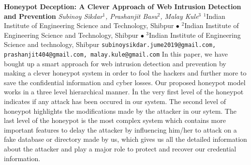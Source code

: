 
    \begin{conf-abstract}[]
        {\textbf{Honeypot Deception: A Clever Approach of Web Intrusion Detection and Prevention}}
        {\textit{Subinoy Sikdar$^{1}$, Prashanjit Basu$^{2}$, Malay Kule$^{3}$}}
        {$^{1}$Indian Institute of Engineering Science and Technology, Shibpur $\bullet$ $^{2}$Indian Institute of Engineering Science and Technology, Shibpur $\bullet$ $^{3}$Indian Institute of Engineering Science and technology, Shibpur}
        {\texttt{subinoysikdar.jume2019@gmail.com, prashanjit404@gmail.com, malay.kule@gmail.com}}
        {In this paper, we have bought up a smart approach for web intrusion detection and prevention by making a clever honeypot system in order to fool the hackers and further more to save the confidential information and cyber losses. Our proposed honeypot model works in a three level hierarchical manner. İn the very first level of the honeypot indicates if any attack has been occured in our system. The second level of honeypot highlights the modifications made by the attacker in our sytem. The last level of the honeypot is the most complex system which contains more important features to delay the attacker by influencing him/her to attack on a fake database or directory made by us, which gives us all the detailed information about the attacker and play a major role to protect and recover our credential information.   }
    \end{conf-abstract}
        